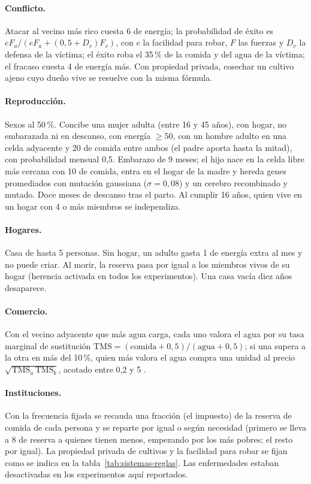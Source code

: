 \documentclass[11pt,a4paper]{article}
\begin{document}
\paragraph{Conflicto.} Atacar al vecino más rico cuesta 6 de energía; la probabilidad de éxito es $eF_a/(eF_a+(0{,}5+D_v)F_v)$, con $e$ la facilidad para robar, $F$ las fuerzas y $D_v$ la defensa de la víctima; el éxito roba el 35\,\% de la comida y del agua de la víctima; el fracaso cuesta 4 de energía más. Con propiedad privada, cosechar un cultivo ajeno cuyo dueño vive se resuelve con la misma fórmula.
\paragraph{Reproducción.} Sexos al 50\,\%. Concibe una mujer adulta (entre 16 y 45 años), con hogar, no embarazada ni en descanso, con energía $\ge 50$, con un hombre adulto en una celda adyacente y 20 de comida entre ambos (el padre aporta hasta la mitad), con probabilidad mensual 0{,}5. Embarazo de 9 meses; el hijo nace en la celda libre más cercana con 10 de comida, entra en el hogar de la madre y hereda genes promediados con mutación gaussiana ($\sigma=0{,}08$) y un cerebro recombinado y mutado. Doce meses de descanso tras el parto. Al cumplir 16 años, quien vive en un hogar con 4 o más miembros se independiza.
\paragraph{Hogares.} Casa de hasta 5 personas. Sin hogar, un adulto gasta 1 de energía extra al mes y no puede criar. Al morir, la reserva pasa por igual a los miembros vivos de su hogar (herencia activada en todos los experimentos). Una casa vacía diez años desaparece.
\paragraph{Comercio.} Con el vecino adyacente que más agua carga, cada uno valora el agua por su tasa marginal de sustitución $\text{TMS}=(\text{comida}+0{,}5)/(\text{agua}+0{,}5)$; si una supera a la otra en más del 10\,\%, quien más valora el agua compra una unidad al precio $\sqrt{\text{TMS}_a\,\text{TMS}_b}$, acotado entre 0{,}2 y 5 \citep[cap.~4]{epstein1996growing}.
\paragraph{Instituciones.} Con la frecuencia fijada se recauda una fracción (el impuesto) de la reserva de comida de cada persona y se reparte por igual o según necesidad (primero se lleva a 8 de reserva a quienes tienen menos, empezando por los más pobres; el resto por igual). La propiedad privada de cultivos y la facilidad para robar se fijan como se indica en la tabla~\ref{tab:sistemas-reglas}. Las enfermedades estaban desactivadas en los experimentos aquí reportados.
\end{document}
